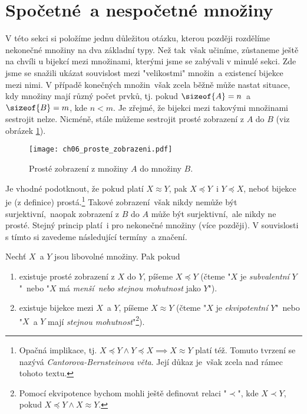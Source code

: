 \section{Spočetné~a nespočetné množiny}\label{sec:spocetne_a_nespocetne_mnoziny}
V této sekci si položíme jednu důležitou otázku, kterou později rozdělíme nekonečné množiny na dva základní typy. Než tak~však učiníme, zůstaneme ještě na chvíli u bijekcí mezi množinami, kterými jsme se zabývali v minulé sekci. Zde jsme se snažili ukázat souvislost mezi "velikostmi" množin~a existencí bijekce mezi nimi. V případě konečných množin~však zcela běžně může nastat situace, kdy množiny mají různý počet prvků, tj. pokud $\sizeof{A}=n$~a $\sizeof{B}=m$, kde $n<m$. Je zřejmé, že bijekci mezi takovými množinami sestrojit nelze. Nicméně, stále můžeme sestrojit prosté zobrazení z $A$ do $B$ (viz obrázek \ref{fig:proste_zobrazeni_A_do_B}).
\begin{figure}[H]
    \centering
    \texttt{[image: ch06\_proste\_zobrazeni.pdf]}
    \caption{Prosté zobrazení z množiny $A$ do množiny $B$.}
    \label{fig:proste_zobrazeni_A_do_B}
\end{figure}
Je vhodné podotknout, že pokud platí $X\approx Y$, pak $X\preccurlyeq Y$~i $Y\preccurlyeq X$, neboť bijekce je (z definice) prostá.\footnote{Opačná implikace, tj. $X\preccurlyeq Y \land Y\preccurlyeq X\implies X\approx Y$ platí též. Tomuto tvrzení se nazývá \emph{Cantorova-Bernsteinova věta}. Její důkaz je~však zcela nad rámec tohoto textu.}
Takové zobrazení~však nikdy nemůže být surjektivní,~naopak zobrazení z $B$ do $A$ může být surjektivní,~ale nikdy ne prosté. Stejný princip platí~i pro nekonečné množiny (více později). V souvislosti s tímto si zavedeme následující termíny~a značení.
\begin{definition}\label{def:subvalence_a_ekvipotence}
    Nechť $X$~a $Y$ jsou libovolné množiny. Pak pokud
    \begin{enumerate}[label=(\roman*)]
        \item existuje prosté zobrazení z $X$ do $Y$, píšeme $X\preccurlyeq Y$ (čteme "$X$ je \emph{subvalentní} $Y$"~nebo "$X$ má \emph{menší~nebo stejnou mohutnost} jako $Y$").
        \item existuje bijekce mezi $X$~a $Y$, píšeme $X\approx Y$ (čteme "$X$ je \emph{ekvipotentní} $Y$"~nebo "$X$~a $Y$ mají \emph{stejnou mohutnost}"\footnote{Pomocí ekvipotence bychom mohli ještě definovat relaci "$\prec$", kde $X\prec Y$, pokud $X\preccurlyeq Y \land X\approx Y$.}).
    \end{enumerate}
\end{definition}

